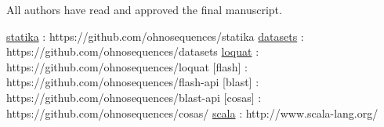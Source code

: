 \documentclass[fleqn,10pt,lineno]{wlpeerj}
\begin{document}
All authors have read and approved the final manuscript.

\protect\hyperlink{statika}{statika} :
https://github.com/ohnosequences/statika
\protect\hyperlink{datasets}{datasets} :
https://github.com/ohnosequences/datasets
\protect\hyperlink{loquat}{loquat} :
https://github.com/ohnosequences/loquat {[}flash{]} :
https://github.com/ohnosequences/flash-api {[}blast{]} :
https://github.com/ohnosequences/blast-api {[}cosas{]} :
https://github.com/ohnosequences/cosas/ \protect\hyperlink{scala}{scala}
: http://www.scala-lang.org/

  

\end{document}
